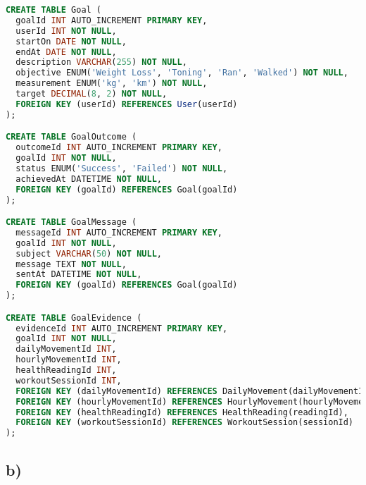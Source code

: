 \documentclass{article}
\begin{document}
\begin{lstlisting}[language=sql]
CREATE TABLE Goal (
  goalId INT AUTO_INCREMENT PRIMARY KEY,
  userId INT NOT NULL,
  startOn DATE NOT NULL,
  endAt DATE NOT NULL,
  description VARCHAR(255) NOT NULL,
  objective ENUM('Weight Loss', 'Toning', 'Ran', 'Walked') NOT NULL,
  measurement ENUM('kg', 'km') NOT NULL,
  target DECIMAL(8, 2) NOT NULL,
  FOREIGN KEY (userId) REFERENCES User(userId)
);

CREATE TABLE GoalOutcome (
  outcomeId INT AUTO_INCREMENT PRIMARY KEY,
  goalId INT NOT NULL,
  status ENUM('Success', 'Failed') NOT NULL,
  achievedAt DATETIME NOT NULL,
  FOREIGN KEY (goalId) REFERENCES Goal(goalId)
);

CREATE TABLE GoalMessage (
  messageId INT AUTO_INCREMENT PRIMARY KEY,
  goalId INT NOT NULL,
  subject VARCHAR(50) NOT NULL,
  message TEXT NOT NULL,
  sentAt DATETIME NOT NULL,
  FOREIGN KEY (goalId) REFERENCES Goal(goalId)
);

CREATE TABLE GoalEvidence (
  evidenceId INT AUTO_INCREMENT PRIMARY KEY,
  goalId INT NOT NULL,
  dailyMovementId INT,
  hourlyMovementId INT,
  healthReadingId INT,
  workoutSessionId INT,
  FOREIGN KEY (dailyMovementId) REFERENCES DailyMovement(dailyMovementId),
  FOREIGN KEY (hourlyMovementId) REFERENCES HourlyMovement(hourlyMovementId),
  FOREIGN KEY (healthReadingId) REFERENCES HealthReading(readingId),
  FOREIGN KEY (workoutSessionId) REFERENCES WorkoutSession(sessionId)
);
\end{lstlisting}


\pagebreak
\subsection*{\small b)}
\end{document}
